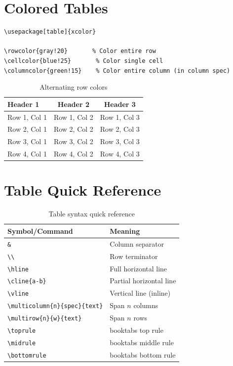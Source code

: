 \section{Colored Tables}

\begin{lstlisting}[language={[LaTeX]TeX}, caption=Colored table rows]
\usepackage[table]{xcolor}

\rowcolor{gray!20}       % Color entire row
\cellcolor{blue!25}       % Color single cell
\columncolor{green!15}    % Color entire column (in column spec)
\end{lstlisting}

\begin{table}[H]
\centering
\begin{tabular}{lcc}
\toprule
\rowcolor{blue!15}
\textbf{Header 1} & \textbf{Header 2} & \textbf{Header 3} \\
\midrule
Row 1, Col 1 & Row 1, Col 2 & Row 1, Col 3 \\
\rowcolor{gray!10}
Row 2, Col 1 & Row 2, Col 2 & Row 2, Col 3 \\
Row 3, Col 1 & Row 3, Col 2 & Row 3, Col 3 \\
\rowcolor{gray!10}
Row 4, Col 1 & Row 4, Col 2 & Row 4, Col 3 \\
\bottomrule
\end{tabular}
\caption{Alternating row colors}
\end{table}

\section{Table Quick Reference}

\begin{table}[H]
\centering
\begin{tabular}{ll}
\toprule
\textbf{Symbol/Command} & \textbf{Meaning} \\
\midrule
\verb|&|               & Column separator \\
\verb|\\|              & Row terminator \\
\verb|\hline|          & Full horizontal line \\
\verb|\cline{a-b}|     & Partial horizontal line \\
\verb|\vline|          & Vertical line (inline) \\
\verb|\multicolumn{n}{spec}{text}| & Span $n$ columns \\
\verb|\multirow{n}{w}{text}| & Span $n$ rows \\
\verb|\toprule|        & booktabs top rule \\
\verb|\midrule|        & booktabs middle rule \\
\verb|\bottomrule|     & booktabs bottom rule \\
\bottomrule
\end{tabular}
\caption{Table syntax quick reference}
\end{table}
